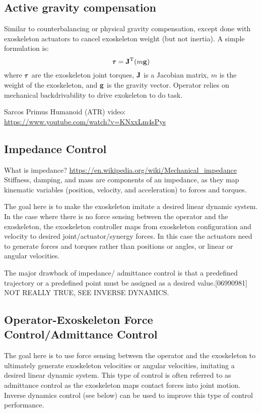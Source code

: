 \documentclass[letterpaper,12pt,fullpage]{article}
\begin{document}
\subsection{Active gravity compensation}

Similar to counterbalancing or physical gravity compensation, except done
with exoskeleton actuators to cancel exoskeleton weight (but not inertia).
A simple formulation is:
\begin{equation}
\vtau = \mJ^{\tr} (m\vg)
\end{equation}
where $\vtau$ are the exoskeleton joint torques, 
${\bf J}$ is a Jacobian matrix, $m$ is the weight of the exoskeleton,
and ${\bf g}$ is the gravity vector. 
Operator relies on mechanical backdrivability to drive
exokeleton to do task.

Sarcos Primus Humanoid (ATR) video:\\
\url{https://www.youtube.com/watch?v=KNxxLm4sPys}

\subsection{Impedance Control}

What is impedance?
\url{https://en.wikipedia.org/wiki/Mechanical_impedance}
Stiffness, damping, and mass are components of an impedance, as
they map kinematic variables (position, velocity, and acceleration)
to forces and torques.

The goal here is to make the exoskeleton imitate a desired linear dynamic system.
In the case where there is no force sensing between the operator and the
exoskeleton, the exoskeleton controller maps from exoskeleton configuration
and velocity to desired joint/actuator/synergy forces.
In this case the actuators need to generate forces and torques rather than
positions or angles, or linear or angular velocities.

The major drawback of impedance/ admittance control
is that a predefined trajectory or a predefined point must be
assigned as a desired value.[06990981] NOT REALLY TRUE, SEE INVERSE DYNAMICS.

\subsection{Operator-Exoskeleton Force Control/Admittance Control}

The goal here is to use force sensing between the operator and the
exoskeleton to ultimately generate exoskeleton velocities or angular velocities,
imitating a desired linear dynamic system.
This type of control is often referred to as admittance control as the
exoskeleton maps contact forces into joint motion.
Inverse dynamics control (see below)
can be used to improve this type of control performance.
\end{document}

